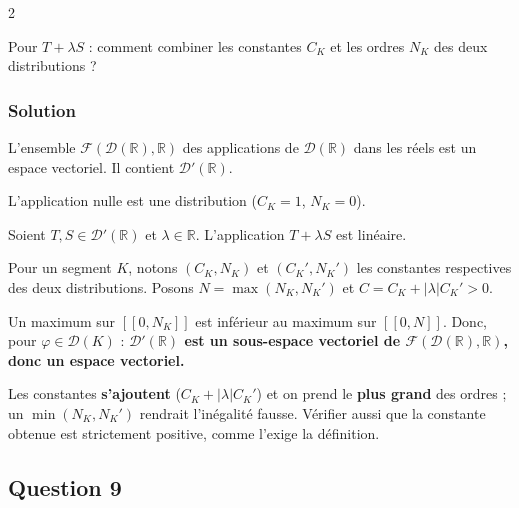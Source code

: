 \documentclass[11pt,a4paper]{article}
\newcommand{\equationajustee}[1]{%
  \sbox{\boiteequation}{$\displaystyle #1$}%
  \ifdim\wd\boiteequation>\linewidth
    \[\resizebox{\linewidth}{!}{\usebox{\boiteequation}}\]%
  \else
    \[#1\]%
  \fi}
\begin{document}
\begin{indication}{2}

Pour \(T+\lambda S\) : comment combiner les constantes \(C_K\) et les ordres \(N_K\) des deux distributions ?

\end{indication}

\hypertarget{solution-7}{%
\subsubsection{Solution}\label{solution-7}}

L'ensemble \(\mathcal F(\mathcal D(\mathbb R),\mathbb R)\) des applications de \(\mathcal D(\mathbb R)\) dans les réels est un espace vectoriel. Il contient \(\mathcal D'(\mathbb R)\).

L'application nulle est une distribution (\(C_K=1\), \(N_K=0\)).

Soient \(T,S\in\mathcal D'(\mathbb R)\) et \(\lambda\in\mathbb R\). L'application \(T+\lambda S\) est linéaire.

Pour un segment \(K\), notons \((C_K,N_K)\) et \((C_K',N_K')\) les constantes respectives des deux distributions. Posons \(N=\max(N_K,N_K')\) et \(C=C_K+|\lambda|C_K'>0\).

Un maximum sur \([\![0,N_K]\!]\) est inférieur au maximum sur \([\![0,N]\!]\). Donc, pour \(\varphi\in\mathcal D(K)\) :
\equationajustee{\begin{aligned}
|(T+\lambda S)(\varphi)|&\leqslant|T(\varphi)|+|\lambda||S(\varphi)|\\
&\leqslant C\max_{i\in[\![0,N]\!]}\|\varphi^{(i)}\|_\infty.
\end{aligned}}
\textbf{\(\mathcal D'(\mathbb R)\) est un sous-espace vectoriel de \(\mathcal F(\mathcal D(\mathbb R),\mathbb R)\), donc un espace vectoriel.}

\begin{piege}

Les constantes \textbf{s'ajoutent} (\(C_K+|\lambda|C_K'\)) et on prend le \textbf{plus grand} des ordres ; un \(\min(N_K,N_K')\) rendrait l'inégalité fausse. Vérifier aussi que la constante obtenue est strictement positive, comme l'exige la définition.

\end{piege}

\hypertarget{question-9}{%
\subsection{Question 9}\label{question-9}}
\end{document}
